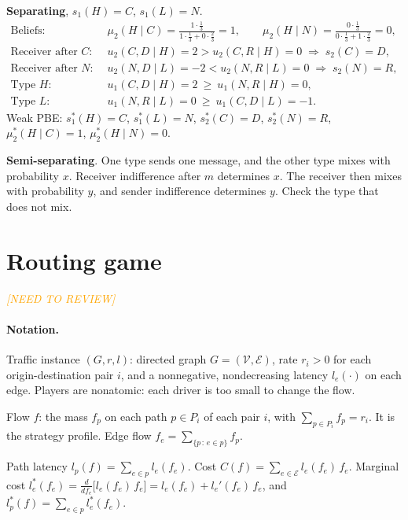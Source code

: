 \documentclass{article}
\newcommand{\todo}[1]{\textit{\textcolor{orange}{ [#1]}}}
\begin{document}
\textbf{Separating}, $s_1(H)=C$, $s_1(L)=N$.
\begin{align*}
    \text{Beliefs}:&\quad \mu_2(H\mid C)=\frac{1\cdot\frac13}{1\cdot\frac13+0\cdot\frac23}=1,\qquad \mu_2(H\mid N)=\frac{0\cdot\frac13}{0\cdot\frac13+1\cdot\frac23}=0,\\
    \text{Receiver after }C:&\quad u_2(C,D\mid H)=2>u_2(C,R\mid H)=0\;\Rightarrow\;s_2(C)=D,\\
    \text{Receiver after }N:&\quad u_2(N,D\mid L)=-2<u_2(N,R\mid L)=0\;\Rightarrow\;s_2(N)=R,\\
    \text{Type }H:&\quad u_1(C,D\mid H)=2\ \ge\ u_1(N,R\mid H)=0,\\
    \text{Type }L:&\quad u_1(N,R\mid L)=0\ \ge\ u_1(C,D\mid L)=-1.
\end{align*}
Weak PBE: $s_1^*(H)=C$, $s_1^*(L)=N$, $s_2^*(C)=D$, $s_2^*(N)=R$, $\mu_2^*(H\mid C)=1$, $\mu_2^*(H\mid N)=0$.

\textbf{Semi-separating}. One type sends one message, and the other type mixes with probability $x$. Receiver indifference after $m$ determines $x$. The receiver then mixes with probability $y$, and sender indifference determines $y$. Check the type that does not mix.


\section{Routing game}
\todo{NEED TO REVIEW}
\paragraph{Notation.}
Traffic instance $(G,r,l)$: directed graph $G=(\mathcal V,\mathcal E)$, rate $r_i>0$ for each origin-destination pair $i$, and a nonnegative, nondecreasing latency $l_e(\cdot)$ on each edge.
Players are nonatomic: each driver is too small to change the flow.

Flow $f$: the mass $f_p$ on each path $p\in P_i$ of each pair $i$, with $\sum_{p\in P_i}f_p=r_i$. It is the strategy profile.
Edge flow $f_e=\sum_{\{p\,:\,e\in p\}}f_p$.

Path latency $l_p(f)=\sum_{e\in p}l_e(f_e)$.
Cost $C(f)=\sum_{e\in\mathcal E}l_e(f_e)\,f_e$.
Marginal cost $l_e^*(f_e)=\frac{d}{df_e}\big[l_e(f_e)\,f_e\big]=l_e(f_e)+l_e'(f_e)\,f_e$, and $l_p^*(f)=\sum_{e\in p}l_e^*(f_e)$.
\end{document}
